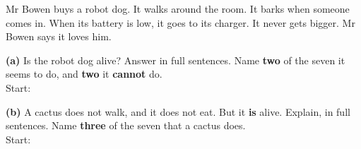 \documentclass[12pt,a4paper]{article}
\newcommand{\qlines}[1]{\par\nobreak
  \noindent\begin{minipage}{\linewidth}\wlines{#1}\end{minipage}\par}
\begin{document}
\noindent\begin{minipage}{\textwidth}
\noindent Mr Bowen buys a robot dog. It walks around the room. It barks when someone
comes in. When its battery is low, it goes to its charger. It never gets bigger. Mr
Bowen says it loves him.

\vspace{6pt}
\noindent\textbf{(a)} Is the robot dog alive? Answer in full sentences. Name \textbf{two}
of the seven it seems to do, and \textbf{two} it \textbf{cannot} do. \\[3pt]
Start: 
\qlines{3}
\end{minipage}

\vspace{8pt}
\noindent\begin{minipage}{\textwidth}
\noindent\textbf{(b)} A cactus does not walk, and it does not eat. But it \textbf{is}
alive. Explain, in full sentences. Name \textbf{three} of the seven that a cactus does.
\\[3pt]
Start: 
\qlines{3}
\end{minipage}


\end{document}
